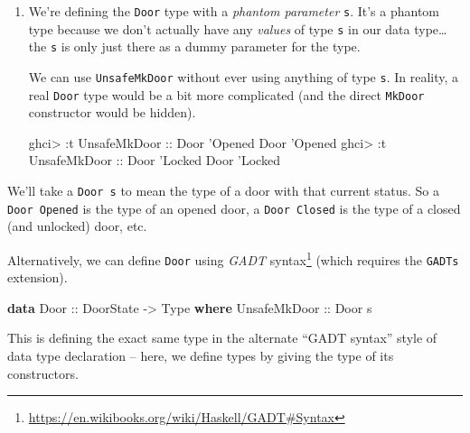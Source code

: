 \documentclass[]{article}
\newenvironment{Shaded}{}{}
\newcommand{\KeywordTok}[1]{\textcolor[rgb]{0.00,0.44,0.13}{\textbf{#1}}}
\newcommand{\DataTypeTok}[1]{\textcolor[rgb]{0.56,0.13,0.00}{#1}}
\newcommand{\CharTok}[1]{\textcolor[rgb]{0.25,0.44,0.63}{#1}}
\newcommand{\OtherTok}[1]{\textcolor[rgb]{0.00,0.44,0.13}{#1}}
\newcommand{\FunctionTok}[1]{\textcolor[rgb]{0.02,0.16,0.49}{#1}}
\newcommand{\NormalTok}[1]{#1}
\renewcommand{\href}[2]{#2\footnote{\url{#1}}}
\begin{document}
\begin{enumerate}
\def\labelenumi{\arabic{enumi}.}
\setcounter{enumi}{1}
\item
  We're defining the \texttt{Door} type with a \emph{phantom parameter}
  \texttt{s}. It's a phantom type because we don't actually have any
  \emph{values} of type \texttt{s} in our data type\ldots{}the \texttt{s} is
  only just there as a dummy parameter for the type.

  We can use \texttt{UnsafeMkDoor} without ever using anything of type
  \texttt{s}. In reality, a real \texttt{Door} type would be a bit more
  complicated (and the direct \texttt{MkDoor} constructor would be hidden).

\begin{Shaded}
\begin{Highlighting}[]
\NormalTok{ghci}\FunctionTok{>} \FunctionTok{:}\NormalTok{t }\DataTypeTok{UnsafeMkDoor}\OtherTok{ ::} \DataTypeTok{Door} \CharTok{'Opened}
\DataTypeTok{Door} \CharTok{'Opened}
\NormalTok{ghci}\FunctionTok{>} \FunctionTok{:}\NormalTok{t }\DataTypeTok{UnsafeMkDoor}\OtherTok{ ::} \DataTypeTok{Door} \CharTok{'Locked}
\DataTypeTok{Door} \CharTok{'Locked}
\end{Highlighting}
\end{Shaded}
\end{enumerate}

We'll take a \texttt{Door\ s} to mean the type of a door with that current
status. So a \texttt{Door\ \textquotesingle{}Opened} is the type of an opened
door, a \texttt{Door\ \textquotesingle{}Closed} is the type of a closed (and
unlocked) door, etc.

Alternatively, we can define \texttt{Door} using
\href{https://en.wikibooks.org/wiki/Haskell/GADT\#Syntax}{\emph{GADT} syntax}
(which requires the \texttt{GADTs} extension).

\begin{Shaded}
\begin{Highlighting}[]
\KeywordTok{data} \DataTypeTok{Door}\OtherTok{ ::} \DataTypeTok{DoorState} \OtherTok{->} \DataTypeTok{Type} \KeywordTok{where}
    \DataTypeTok{UnsafeMkDoor}\OtherTok{ ::} \DataTypeTok{Door}\NormalTok{ s}
\end{Highlighting}
\end{Shaded}

This is defining the exact same type in the alternate ``GADT syntax'' style of
data type declaration -- here, we define types by giving the type of its
constructors.
\end{document}
